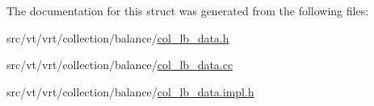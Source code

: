The documentation for this struct was generated from the following files\+:\begin{DoxyCompactItemize}
\item 
src/vt/vrt/collection/balance/\hyperlink{col__lb__data_8h}{col\+\_\+lb\+\_\+data.\+h}\item 
src/vt/vrt/collection/balance/\hyperlink{col__lb__data_8cc}{col\+\_\+lb\+\_\+data.\+cc}\item 
src/vt/vrt/collection/balance/\hyperlink{col__lb__data_8impl_8h}{col\+\_\+lb\+\_\+data.\+impl.\+h}\end{DoxyCompactItemize}

